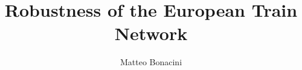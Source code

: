 \documentclass[compsoc]{IEEEtran}
\begin{document}
\title{Robustness of the European Train Network}

\author{
Matteo Bonacini%
}


\onecolumn
\maketitle

\tableofcontents
\clearpage
\raggedbottom

\twocolumn










\onecolumn
\clearpage
\appendices

\end{document}
